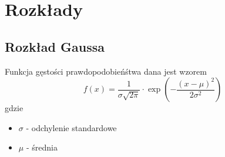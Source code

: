 \section*{Rozkłady}

\subsection*{Rozkład Gaussa}

Funkcja gęstości prawdopodobieńśtwa dana jest wzorem
\begin{equation*}
    f(x) = \frac{1 }{\sigma \sqrt{2\pi}} \cdot 
    \exp{\left(-\frac{(x-\mu)^2}{2\sigma^2}\right)}
\end{equation*}
gdzie
\begin{itemize}
    \item $\sigma$ - odchylenie standardowe
    \item $\mu$ - średnia
\end{itemize}